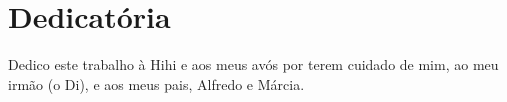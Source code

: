 \chapter*{Dedicatória}

\noindent Dedico este trabalho à Hihi e aos meus avós por terem cuidado de mim, ao meu irmão (o Di), e aos meus pais, Alfredo e Márcia.